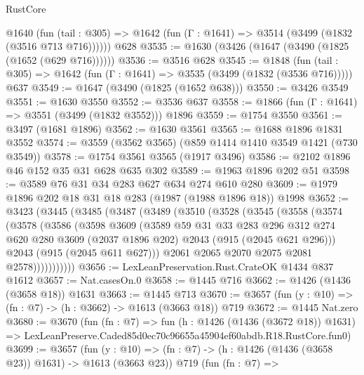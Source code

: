 \begin{lexlean}{RustCore}
\begin{coremodule}
    @1640 (fun (tail : @305) => @1642 (fun (Γ : @1641) => @3514 (@3499 (@1832 (@3516 @713 @716))))))
    @628
@3535 := @1630 (@3426 (@1647 (@3490 (@1825 (@1652 (@629 @716))))))
@3536 := @3516 @628
@3545 := @1848
    (fun (tail : @305) => @1642 (fun (Γ : @1641) => @3535 (@3499 (@1832 (@3536 @716)))))
    @637
@3549 := @1647 (@3490 (@1825 (@1652 @638)))
@3550 := @3426 @3549
@3551 := @1630 @3550
@3552 := @3536 @637
@3558 := @1866 (fun (Γ : @1641) => @3551 (@3499 (@1832 @3552))) @1896
@3559 := @1754 @3550
@3561 := @3497 (@1681 @1896)
@3562 := @1630 @3561
@3565 := @1688 @1896 @1831 @3552
@3574 := @3559 (@3562 @3565) (@859 @1414 @1410 @3549 @1421 (@730 @3549))
@3578 := @1754 @3561 @3565 (@1917 @3496)
@3586 := @2102 @1896 @46 @152 @35 @31 @628 @635 @302
@3589 := @1963 @1896 @202 @51
@3598 := @3589 @76 @31 @34 @283 @627 @634 @274 @610 @280
@3609 := @1979 @1896 @202 @18 @31 @18 @283 (@1987 (@1988 @1896 @18)) @1998
@3652 := @3423
    (@3445
      (@3485
        (@3487
          (@3489
            (@3510
              (@3528
                (@3545
                  (@3558
                    (@3574
                      (@3578
                        (@3586
                          (@3598
                            @3609
                            (@3589
                              @59
                              @31
                              @33
                              @283
                              @296
                              @312
                              @274
                              @620
                              @280
                              @3609
                              (@2037 @1896 @202)
                              @2043
                              (@915 (@2045 @621 @296)))
                            @2043
                            (@915 (@2045 @611 @627)))
                          @2061
                          @2065
                          @2070
                          @2075
                          @2081
                          @2578)))))))))))
@3656 := LexLeanPreservation.Rust.CrateOK @1434 @837 @1612
@3657 := Nat.casesOn.{0}
@3658 := @1445 @716
@3662 := @1426 (@1436 (@3658 @18)) @1631
@3663 := @1445 @713
@3670 := @3657 (fun (y : @10) => (fn : @7) -> (h : @3662) -> @1613 (@3663 @18)) @719
@3672 := @1445 Nat.zero
@3680 := @3670
    (fun (fn : @7) =>
    fun (h : @1426 (@1436 (@3672 @18)) @1631) =>
    LexLeanPreserve.Caded85d0ec70c96655a45904ef60abdb.R18.RustCore.fun0)
@3699 := @3657
    (fun (y : @10) => (fn : @7) -> (h : @1426 (@1436 (@3658 @23)) @1631) -> @1613 (@3663 @23))
    @719
    (fun (fn : @7) =>

\end{coremodule}
\end{lexlean}

